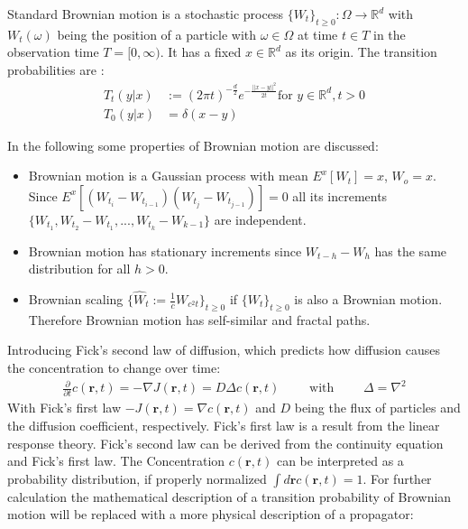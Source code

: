 \documentclass[
  a4paper,BCOR10mm,oneside,
  bibtotoc,idxtotoc,
  headsepline,footsepline,%
  fleqn,openbib
]{scrbook}
\begin{document}
\begin{mydef}
Standard Brownian motion is a stochastic process $ \{ W_t \}_{t\geq0}: \Omega \rightarrow \mathbb{R}^d$ with $ W_t(\omega)$ being the position of a particle with $\omega \in \Omega$ at time $t \in T$ in the observation time $T =[0, \infty)$. It has a fixed $x \in \mathbb{R}^d$ as its origin. The transition probabilities are \cite{LectureFelix}: 
\begin{align}
T_{t}(y|x) & := (2 \pi t)^{- \frac{d}{2}} e^{- \frac{||x-y||^2}{2 t}} \text{for } y \in \mathbb{R}^d, t>0 \\ \nonumber
T_{0}(y|x) & = \delta(x-y) 
\end{align}
\end{mydef}
In the following some properties of Brownian motion are discussed:\\
\begin{itemize} \label{bscaling}
\item Brownian motion is a Gaussian process with mean $E^x[W_t]=x$, $W_o=x$.
Since $ E^x[(W_{t_i}-W_{t_{i-1}})(W_{t_j}-W_{t_{j-1}})]=0 $  all its increments $\{W_{t_1},W_{t_2}-W_{t_1},...,W_{t_k}-W_{k-1}\}$ are independent.

\item Brownian motion has stationary increments since ${W_{t-h}-W_{h}}$ has the same distribution for all $h>0$.

\item  Brownian scaling $\{\hat{W}_t := \frac{1}{c} W_{c^2 t} \}_{t\geq0}$ if $\{W_t\}_{t \geq 0}$  is also a Brownian motion. Therefore Brownian motion has self-similar and fractal paths. 
\end{itemize}
Introducing Fick's second law of diffusion, which predicts how diffusion causes the concentration to change over time:
\begin{align}
 \frac{\partial}{\partial t} c(\bm{r},t) = - \nabla J (\bm{r},t) = D  \Delta c(\bm{r},t) \qquad \text{ with } \qquad \Delta= \nabla^2  \label{eq:ficks}
\end{align}
With Fick's first law $-J(\bm{r},t)=\nabla c(\bm{r},t)$ and $D$ being the flux of particles and the diffusion coefficient, respectively. Fick's first law is a result from the linear response theory. Fick's second law can be derived from the continuity equation and Fick's first law. The Concentration $c(\bm{r},t)$ can be interpreted as a probability distribution, if properly normalized  $\int d\bm{r} c(\bm{r},t)=1$. For further calculation the mathematical description of a transition probability of Brownian motion will be replaced with a more physical description of a propagator:
\end{document}
